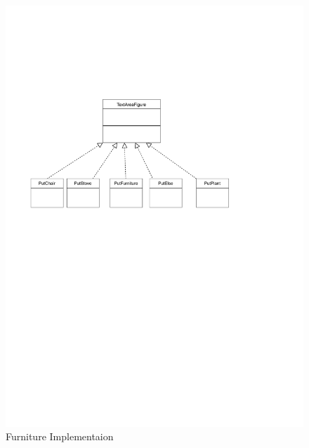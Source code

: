\begin{figure}[h]
    \includegraphics[keepaspectratio,width=\textwidth]{images/UML2.pdf}
    \caption{Furniture Implementaion}
\end{figure}

